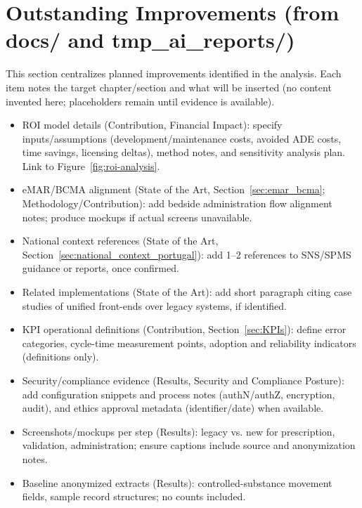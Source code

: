 \section{Outstanding Improvements (from docs/ and tmp\_ai\_reports/)}
This section centralizes planned improvements identified in the analysis. Each item notes the target chapter/section and what will be inserted (no content invented here; placeholders remain until evidence is available).
\begin{itemize}
    \item ROI model details (Contribution, Financial Impact): specify inputs/assumptions (development/maintenance costs, avoided ADE costs, time savings, licensing deltas), method notes, and sensitivity analysis plan. Link to Figure~\ref{fig:roi-analysis}.
    \item eMAR/BCMA alignment (State of the Art, Section~\ref{sec:emar_bcma}; Methodology/Contribution): add bedside administration flow alignment notes; produce mockups if actual screens unavailable.
    \item National context references (State of the Art, Section~\ref{sec:national_context_portugal}): add 1--2 references to SNS/SPMS guidance or reports, once confirmed.
    \item Related implementations (State of the Art): add short paragraph citing case studies of unified front-ends over legacy systems, if identified.
    \item KPI operational definitions (Contribution, Section~\ref{sec:KPIs}): define error categories, cycle-time measurement points, adoption and reliability indicators (definitions only).
    \item Security/compliance evidence (Results, Security and Compliance Posture): add configuration snippets and process notes (authN/authZ, encryption, audit), and ethics approval metadata (identifier/date) when available.
    \item Screenshots/mockups per step (Results): legacy vs. new for prescription, validation, administration; ensure captions include source and anonymization notes.
    \item Baseline anonymized extracts (Results): controlled-substance movement fields, sample record structures; no counts included.
\end{itemize}

